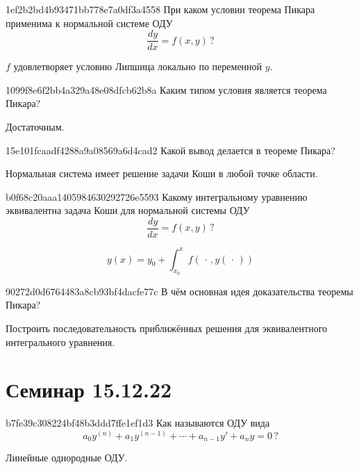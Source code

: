 \begin{note}{1ef2b2bd4b93471bb778e7a0df3a4558}
    При каком условии теорема Пикара применима к нормальной системе ОДУ
    \[
        \frac{dy}{dx} = f(x, y)\,?
    \]

    \begin{cloze}{1}
        \({ f }\) удовлетворяет условию Липшица локально по переменной \({ y }\).
    \end{cloze}
\end{note}

\begin{note}{1099f8e6f2bb4a329a48e08dfcb62b8a}
    Каким типом условия является теорема Пикара?

    \begin{cloze}{1}
        Достаточным.
    \end{cloze}
\end{note}

\begin{note}{15e101fcaadf4288a9a08569a6d4cad2}
    Какой вывод делается в теореме Пикара?

    \begin{cloze}{1}
        Нормальная система имеет решение задачи Коши в любой точке области.
    \end{cloze}
\end{note}

\begin{note}{b0f68c20aaa1405984630292726e5593}
    Какому интегральному уравнению эквивалентна задача Коши для нормальной системы ОДУ
    \[
        \frac{dy}{dx} = f(x, y)\,?
    \]

    \begin{cloze}{1}
        \[
            y(x) = y_0 + \int_{x_0}^{x} f(\,\cdot\,, y( \,\cdot\, ))
        \]
    \end{cloze}
\end{note}

\begin{note}{90272d0d6764483a8cb93bf4dacfe77c}
    В чём основная идея доказательства теоремы Пикара?

    \begin{cloze}{1}
        Построить последовательность приближённых решения для эквивалентного интегрального уравнения.
    \end{cloze}
\end{note}

\section{Семинар 15.12.22}
\begin{note}{b7fe39c308224bf48b3ddd7ffe1ef1d3}
    Как называются ОДУ вида
    \[
        a_0 y^{(n)} + a_1y^{(n-1)} + \cdots + a_{n-1}y' + a_n y = 0\,?
    \]

    \begin{cloze}{1}
        Линейные однородные ОДУ.
    \end{cloze}
\end{note}

